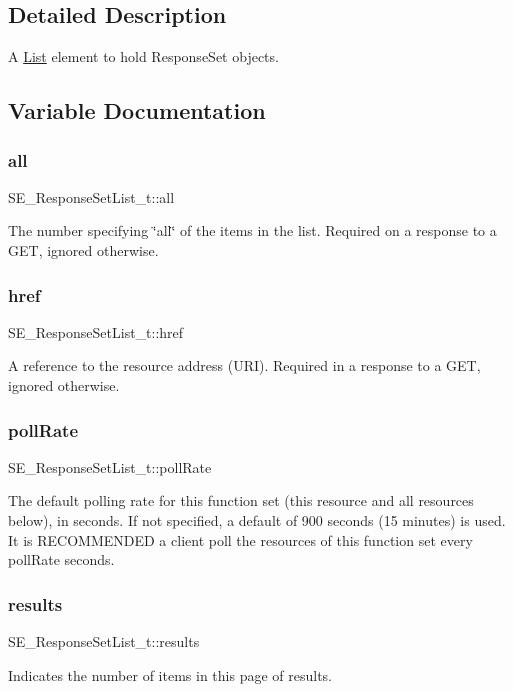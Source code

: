 \subsection{Detailed Description}
A \hyperlink{structList}{List} element to hold Response\+Set objects. 

\subsection{Variable Documentation}
\mbox{\label{group__ResponseSetList_gacd39a1a009fb2aa7adbea7016bfe6c29}} 
\subsubsection{\texorpdfstring{all}{all}}
{\footnotesize\ttfamily S\+E\+\_\+\+Response\+Set\+List\+\_\+t\+::all}

The number specifying \char`\"{}all\char`\"{} of the items in the list. Required on a response to a G\+ET, ignored otherwise. \mbox{\label{group__ResponseSetList_gadc2f2a201658b2bf27072ae811b9b014}} 
\subsubsection{\texorpdfstring{href}{href}}
{\footnotesize\ttfamily S\+E\+\_\+\+Response\+Set\+List\+\_\+t\+::href}

A reference to the resource address (U\+RI). Required in a response to a G\+ET, ignored otherwise. \mbox{\label{group__ResponseSetList_gad0b2c3c48abf6ac9c5426cc6942d4b55}} 
\subsubsection{\texorpdfstring{poll\+Rate}{pollRate}}
{\footnotesize\ttfamily S\+E\+\_\+\+Response\+Set\+List\+\_\+t\+::poll\+Rate}

The default polling rate for this function set (this resource and all resources below), in seconds. If not specified, a default of 900 seconds (15 minutes) is used. It is R\+E\+C\+O\+M\+M\+E\+N\+D\+ED a client poll the resources of this function set every poll\+Rate seconds. \mbox{\label{group__ResponseSetList_gaa96307d02ec1a098b78dc3f11eedff51}} 
\subsubsection{\texorpdfstring{results}{results}}
{\footnotesize\ttfamily S\+E\+\_\+\+Response\+Set\+List\+\_\+t\+::results}

Indicates the number of items in this page of results. 